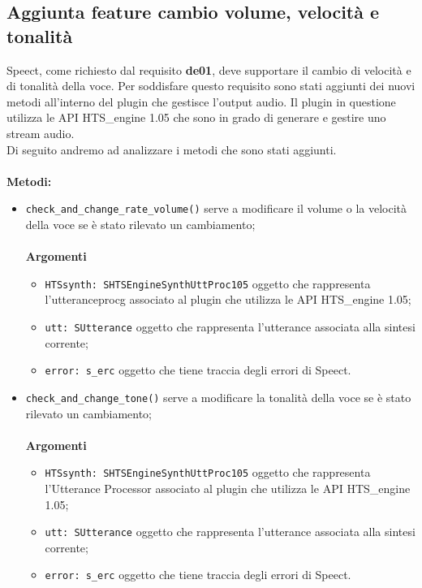 \subsection{Aggiunta feature cambio volume, velocità e tonalità}
Speect, come richiesto dal requisito \textbf{de01}, deve supportare il cambio di velocità e di tonalità della voce. 
Per soddisfare questo requisito sono stati aggiunti dei nuovi metodi all'interno del plugin che gestisce l'output audio.
Il plugin in questione utilizza le API HTS\_engine 1.05 che sono in grado di generare e gestire uno stream audio.\\
Di seguito andremo ad analizzare i metodi che sono stati aggiunti.\\\\
\textbf{Metodi:}
\begin{itemize}
	\item \texttt{check\_and\_change\_rate\_volume()} serve a modificare il volume o la velocità della voce se è stato rilevato un cambiamento;\\\\
	\textbf{Argomenti}
	\begin{itemize}
		\item \texttt{HTSsynth: SHTSEngineSynthUttProc105} oggetto che rappresenta \\l'\gls{utteranceprocg} associato al plugin che utilizza le API HTS\_engine 1.05;
		\item \texttt{utt: SUtterance} oggetto che rappresenta l'utterance associata alla sintesi corrente;
		\item \texttt{error: s\_erc} oggetto che tiene traccia degli errori di Speect.
	\end{itemize}
	\item \texttt{check\_and\_change\_tone()} serve a modificare la tonalità della voce se è stato rilevato un cambiamento;\\\\
	\textbf{Argomenti}
	\begin{itemize}
		\item \texttt{HTSsynth: SHTSEngineSynthUttProc105} oggetto che rappresenta l'Utterance Processor associato al plugin che utilizza le API HTS\_engine 1.05;
		\item \texttt{utt: SUtterance} oggetto che rappresenta l'utterance associata alla sintesi corrente;
		\item \texttt{error: s\_erc} oggetto che tiene traccia degli errori di Speect.
	\end{itemize}
\end{itemize}

